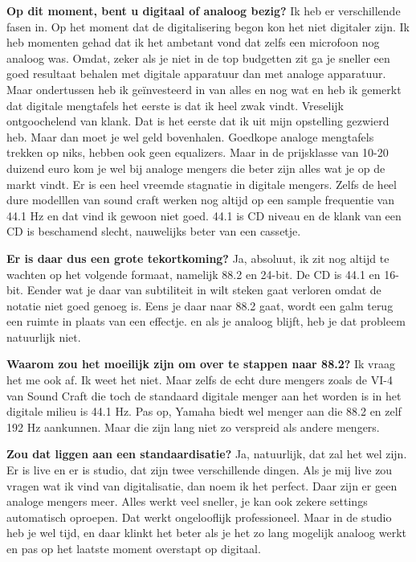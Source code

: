 \textbf{Op dit moment, bent u digitaal of analoog bezig?}\newline
Ik heb er verschillende fasen in. Op het moment dat de digitalisering begon kon het niet digitaler zijn.
Ik heb momenten gehad dat ik het ambetant vond dat zelfs een microfoon nog analoog was.
Omdat, zeker als je niet in de top budgetten zit ga je sneller een goed resultaat behalen met digitale apparatuur dan met analoge apparatuur.
Maar ondertussen heb ik geïnvesteerd in van alles en nog wat en heb ik gemerkt dat digitale mengtafels het eerste is dat ik heel zwak vindt.
Vreselijk ontgoochelend van klank. Dat is het eerste dat ik uit mijn opstelling gezwierd heb. Maar dan moet je wel geld bovenhalen.
Goedkope analoge mengtafels trekken op niks, hebben ook geen equalizers. Maar in de prijsklasse van 10-20 duizend euro kom je wel bij analoge mengers die beter zijn alles wat je op de markt vindt.
Er is een heel vreemde stagnatie in digitale mengers. Zelfs de heel dure modelllen van sound craft werken nog altijd op een sample frequentie van 44.1 Hz en dat vind ik gewoon niet goed.
44.1 is CD niveau en de klank van een CD is beschamend slecht, nauwelijks beter van een cassetje.

\textbf{Er is daar dus een grote tekortkoming?}\newline
Ja, absoluut, ik zit nog altijd te wachten op het volgende formaat, namelijk 88.2 en 24-bit. De CD is 44.1 en 16-bit. Eender wat je daar van subtiliteit in wilt steken gaat verloren omdat de notatie niet goed genoeg is.
Eens je daar naar 88.2 gaat, wordt een galm terug een ruimte in plaats van een effectje. en als je analoog blijft, heb je dat probleem natuurlijk niet.

\textbf{Waarom zou het moeilijk zijn om over te stappen naar 88.2?}\newline
Ik vraag het me ook af. Ik weet het niet. Maar zelfs de echt dure mengers zoals de VI-4 van Sound Craft die toch de standaard digitale menger aan het worden is in het digitale milieu is 44.1 Hz.
Pas op, Yamaha biedt wel menger aan die 88.2 en zelf 192 Hz aankunnen. Maar die zijn lang niet zo verspreid als andere mengers.

\textbf{Zou dat liggen aan een standaardisatie?}\newline
Ja, natuurlijk, dat zal het wel zijn. Er is live en er is studio, dat zijn twee verschillende dingen. Als je mij live zou vragen wat ik vind van digitalisatie, dan noem ik het perfect.
Daar zijn er geen analoge mengers meer. Alles werkt veel sneller, je kan ook zekere settings automatisch oproepen. Dat werkt ongelooflijk professioneel.
Maar in de studio heb je wel tijd, en daar klinkt het beter als je het zo lang mogelijk analoog werkt en pas op het laatste moment overstapt op digitaal.


